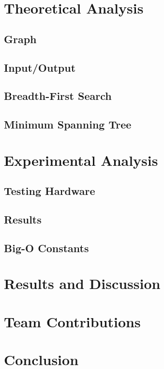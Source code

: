 \documentclass[titlepage]{article}
\begin{document}
\begin{multicols}{2}
		\section{Theoretical Analysis}
			\subsection{Graph}
			\subsection{Input/Output}
			\subsection{Breadth-First Search}
			\subsection{Minimum Spanning Tree}

		\section{Experimental Analysis}
			\subsection{Testing Hardware}
			\subsection{Results}
			\subsection{Big-O Constants}
		\section{Results and Discussion}
		\section{Team Contributions}
		\section{Conclusion}
	\end{multicols}
\end{document}
